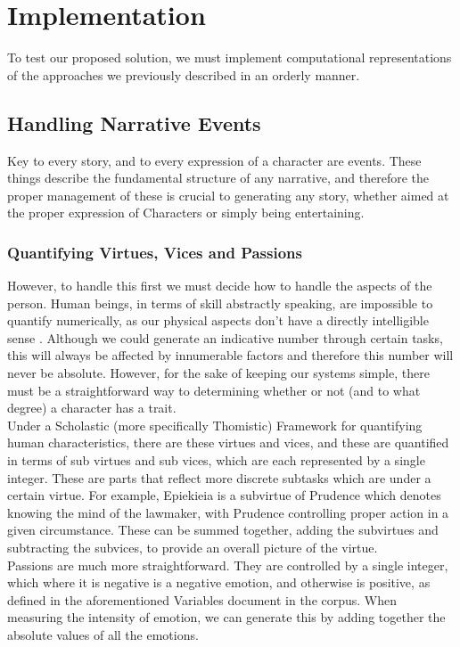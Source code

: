 \documentclass[11pt]{article}
\begin{document}
\section{Implementation}
To test our proposed solution, we must implement computational representations of the approaches we previously described in an orderly manner.\\
\subsection{Handling Narrative Events}
Key to every story, and to every expression of a character are events. These things describe the fundamental structure of any narrative, and therefore the proper management of these is crucial to generating any story, whether aimed at the proper expression of Characters or simply being entertaining.\\
\subsubsection{Quantifying Virtues, Vices and Passions}
However, to handle this first we must decide how to handle the aspects of the person. Human beings, in terms of skill abstractly speaking, are impossible to quantify numerically, as our physical aspects don't have a directly intelligible sense \cite{Feser2013-FESKRA} \cite{ross1992immaterial}. Although we could generate an indicative number through certain tasks, this will always be affected by innumerable factors and therefore this number will never be absolute. However, for the sake of keeping our systems simple, there must be a straightforward way to determining whether or not (and to what degree) a character has a trait.\\
Under a Scholastic (more specifically Thomistic) Framework for quantifying human characteristics, there are these virtues and vices, and these are quantified in terms of sub virtues and sub vices, which are each represented by a single integer. These are parts that reflect more discrete subtasks which are under a certain virtue. For example, Epiekieia is a subvirtue of Prudence which denotes knowing the mind of the lawmaker, with Prudence controlling proper action in a given circumstance. These can be summed together, adding the subvirtues and subtracting the subvices, to provide an overall picture of the virtue.\\
Passions are much more straightforward. They are controlled by a single integer, which where it is negative is a negative emotion, and otherwise is positive, as defined in the aforementioned Variables document in the corpus. When measuring the intensity of emotion, we can generate this by adding together the absolute values of all the emotions.\\
\end{document}
